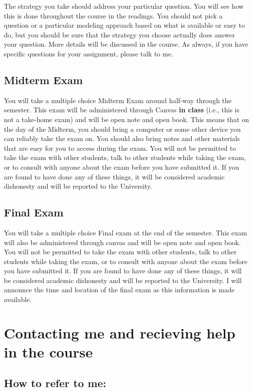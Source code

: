 \documentclass[11pt, a4paper]{article}
\begin{document}
    The strategy you take should address your particular question. You will see how this is done throughout the course in the readings. You should not pick a question or a particular modeling approach based on what is available or easy to do, but you should be sure that the strategy you choose actually does answer your question. More details will be discussed in the course. As always, if you have specific questions for your assignment, please talk to me.
    \subsection*{Midterm Exam}

    You will take a multiple choice Midterm Exam around half-way through the semester. This exam will be administered through Canvas \textbf{in class} (i.e., this is not a take-home exam) and will be open note and open book. This means that on the day of the Midterm, you should bring a computer or some other device you can reliably take the exam on. You should also bring notes and other materials that are easy for you to access during the exam. You will not be permitted to take the exam with other students, talk to other students while taking the exam, or to consult with anyone about the exam before you have submitted it. If you are found to have done any of these things, it will be considered academic dishonesty and will be reported to the University.

    \subsection*{Final Exam}

    You will take a multiple choice Final exam at the end of the semester. This exam will also be administered through canvas and will be open note and open book. You will not be permitted to take the exam with other students, talk to other students while taking the exam, or to consult with anyone about the exam before you have submitted it. If you are found to have done any of these things, it will be considered academic dishonesty and will be reported to the University. I will announce the time and location of the final exam as this information is made available.

\section*{Contacting me and recieving help in the course}
\subsection*{How to refer to me:}
\end{document}
